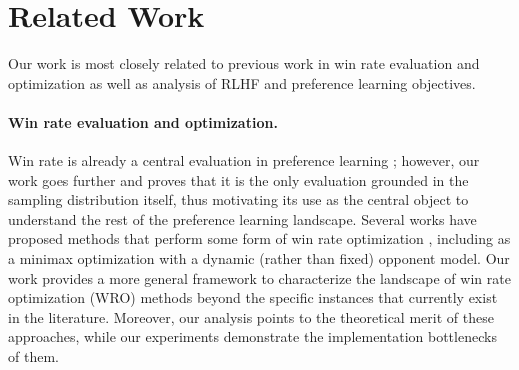 \section{Related Work}
\label{sec:related}
Our work is most closely related to previous work in win rate evaluation and optimization as well as analysis of RLHF and preference learning objectives.

\paragraph{Win rate evaluation and optimization.} 
Win rate is already a central evaluation in preference learning \citep{alpaca_eval,zheng2024judging}; however, our work goes further and proves that it is the only evaluation grounded in the sampling distribution itself, thus motivating its use as the central object to understand the rest of the preference learning landscape.
Several works have proposed methods that perform some form of win rate optimization \citep{munos2023nash, swamy2024minimaximalistapproachreinforcementlearning, rosset2024directnashoptimizationteaching}, including as a minimax optimization with a dynamic (rather than fixed) opponent model. Our work provides a more general framework to characterize the landscape of win rate optimization (WRO) methods beyond the specific instances that currently exist in the literature. Moreover, our analysis points to the theoretical merit of these approaches, while our experiments demonstrate the implementation bottlenecks of them.


